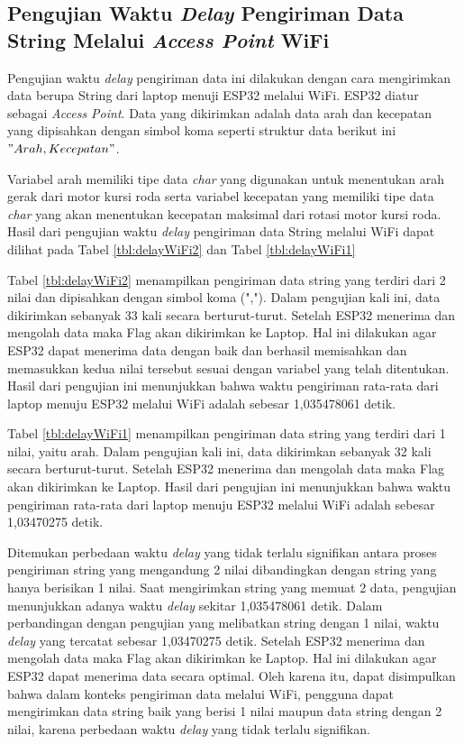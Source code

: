 \subsection{Pengujian Waktu \emph{Delay} Pengiriman Data String Melalui \emph{Access Point} WiFi}
\label{sec:delayWiFi}

Pengujian waktu \emph{delay} pengiriman data ini dilakukan dengan cara mengirimkan data berupa String dari laptop menuji ESP32 melalui WiFi. ESP32 diatur sebagai \emph{Access Point}. Data yang dikirimkan adalah data arah dan kecepatan yang dipisahkan dengan simbol koma seperti struktur data berikut ini \("Arah, Kecepatan"\).

Variabel arah memiliki tipe data \emph{char} yang digunakan untuk menentukan arah gerak dari motor kursi roda serta variabel kecepatan yang memiliki tipe data \emph{char} yang akan menentukan kecepatan maksimal dari rotasi motor kursi roda. Hasil dari pengujian waktu \emph{delay} pengiriman data String melalui WiFi dapat dilihat pada Tabel \ref{tbl:delayWiFi2} dan Tabel \ref{tbl:delayWiFi1}

Tabel \ref{tbl:delayWiFi2} menampilkan pengiriman data string yang terdiri dari 2 nilai dan dipisahkan dengan simbol koma (","). Dalam pengujian kali ini, data dikirimkan sebanyak 33 kali secara berturut-turut. Setelah ESP32 menerima dan mengolah data maka Flag akan dikirimkan ke Laptop. Hal ini dilakukan agar ESP32 dapat menerima data dengan baik dan berhasil memisahkan dan memasukkan kedua nilai tersebut sesuai dengan variabel yang telah ditentukan. Hasil dari pengujian ini menunjukkan bahwa waktu pengiriman rata-rata dari laptop menuju ESP32 melalui WiFi adalah sebesar 1,035478061 detik.

Tabel \ref{tbl:delayWiFi1} menampilkan pengiriman data string yang terdiri dari 1 nilai, yaitu arah. Dalam pengujian kali ini, data dikirimkan sebanyak 32 kali secara berturut-turut. Setelah ESP32 menerima dan mengolah data maka Flag akan dikirimkan ke Laptop. Hasil dari pengujian ini menunjukkan bahwa waktu pengiriman rata-rata dari laptop menuju ESP32 melalui WiFi adalah sebesar 1,03470275 detik.

Ditemukan perbedaan waktu \emph{delay} yang tidak terlalu signifikan antara proses pengiriman string yang mengandung 2 nilai dibandingkan dengan string yang hanya berisikan 1 nilai. Saat mengirimkan string yang memuat 2 data, pengujian menunjukkan adanya waktu \emph{delay} sekitar 1,035478061 detik. Dalam perbandingan dengan pengujian yang melibatkan string dengan 1 nilai, waktu \emph{delay} yang tercatat sebesar 1,03470275 detik. Setelah ESP32 menerima dan mengolah data maka Flag akan dikirimkan ke Laptop. Hal ini dilakukan agar ESP32 dapat menerima data secara optimal. Oleh karena itu, dapat disimpulkan bahwa dalam konteks pengiriman data melalui WiFi, pengguna dapat mengirimkan data string baik yang berisi 1 nilai maupun data string dengan 2 nilai, karena perbedaan waktu \emph{delay} yang tidak terlalu signifikan.

